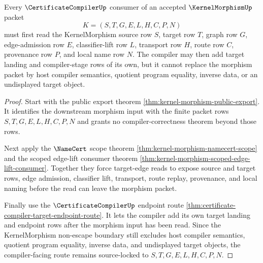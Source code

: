 \begin{theorem}
\label{thm:kernel-morphism-certificate-compiler-source-lock}
Every $\CertificateCompilerUp$ consumer of an accepted $\KernelMorphismUp$ packet
$$
K=(S,T,G,E,L,H,C,P,N)
$$
must first read the KernelMorphism source row $S$, target row $T$, graph row $G$, edge-admission row $E$, classifier-lift row $L$, transport row $H$, route row $C$, provenance row $P$, and local name row $N$. The compiler may then add target landing and compiler-stage rows of its own, but it cannot replace the morphism packet by host compiler semantics, quotient program equality, inverse data, or an undisplayed target object.
\end{theorem}
\begin{proof}
Start with the public export theorem \autoref{thm:kernel-morphism-public-export}. It identifies the downstream morphism input with the finite packet rows $S,T,G,E,L,H,C,P,N$ and grants no compiler-correctness theorem beyond those rows.

Next apply the $\NameCert$ scope theorem \autoref{thm:kernel-morphism-namecert-scope} and the scoped edge-lift consumer theorem \autoref{thm:kernel-morphism-scoped-edge-lift-consumer}. Together they force target-edge reads to expose source and target rows, edge admission, classifier lift, transport, route replay, provenance, and local naming before the read can leave the morphism packet.

Finally use the $\CertificateCompilerUp$ endpoint route \autoref{thm:certificate-compiler-target-endpoint-route}. It lets the compiler add its own target landing and endpoint rows after the morphism input has been read. Since the KernelMorphism non-escape boundary still excludes host compiler semantics, quotient program equality, inverse data, and undisplayed target objects, the compiler-facing route remains source-locked to $S,T,G,E,L,H,C,P,N$.
\end{proof}


